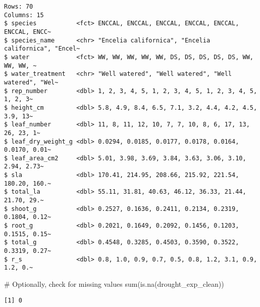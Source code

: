 \documentclass[
  letterpaper,
  DIV=11,
  numbers=noendperiod]{scrartcl}
\newenvironment{Shaded}{\begin{snugshade}}{\end{snugshade}}
\newcommand{\CommentTok}[1]{\textcolor[rgb]{0.37,0.37,0.37}{#1}}
\newcommand{\FunctionTok}[1]{\textcolor[rgb]{0.28,0.35,0.67}{#1}}
\newcommand{\NormalTok}[1]{\textcolor[rgb]{0.00,0.23,0.31}{#1}}
\begin{document}
\begin{verbatim}
Rows: 70
Columns: 15
$ species           <fct> ENCCAL, ENCCAL, ENCCAL, ENCCAL, ENCCAL, ENCCAL, ENCC~
$ species_name      <chr> "Encelia californica", "Encelia californica", "Encel~
$ water             <fct> WW, WW, WW, WW, WW, DS, DS, DS, DS, DS, WW, WW, WW, ~
$ water_treatment   <chr> "Well watered", "Well watered", "Well watered", "Wel~
$ rep_number        <dbl> 1, 2, 3, 4, 5, 1, 2, 3, 4, 5, 1, 2, 3, 4, 5, 1, 2, 3~
$ height_cm         <dbl> 5.8, 4.9, 8.4, 6.5, 7.1, 3.2, 4.4, 4.2, 4.5, 3.9, 13~
$ leaf_number       <dbl> 11, 8, 11, 12, 10, 7, 7, 10, 8, 6, 17, 13, 26, 23, 1~
$ leaf_dry_weight_g <dbl> 0.0294, 0.0185, 0.0177, 0.0178, 0.0164, 0.0170, 0.01~
$ leaf_area_cm2     <dbl> 5.01, 3.98, 3.69, 3.84, 3.63, 3.06, 3.10, 2.94, 2.73~
$ sla               <dbl> 170.41, 214.95, 208.66, 215.92, 221.54, 180.20, 160.~
$ total_la          <dbl> 55.11, 31.81, 40.63, 46.12, 36.33, 21.44, 21.70, 29.~
$ shoot_g           <dbl> 0.2527, 0.1636, 0.2411, 0.2134, 0.2319, 0.1804, 0.12~
$ root_g            <dbl> 0.2021, 0.1649, 0.2092, 0.1456, 0.1203, 0.1515, 0.15~
$ total_g           <dbl> 0.4548, 0.3285, 0.4503, 0.3590, 0.3522, 0.3319, 0.27~
$ r_s               <dbl> 0.8, 1.0, 0.9, 0.7, 0.5, 0.8, 1.2, 3.1, 0.9, 1.2, 0.~
\end{verbatim}

\begin{Shaded}
\begin{Highlighting}[]
\CommentTok{\# Optionally, check for missing values}
\FunctionTok{sum}\NormalTok{(}\FunctionTok{is.na}\NormalTok{(drought\_exp\_clean))}
\end{Highlighting}
\end{Shaded}

\begin{verbatim}
[1] 0
\end{verbatim}
\end{document}
